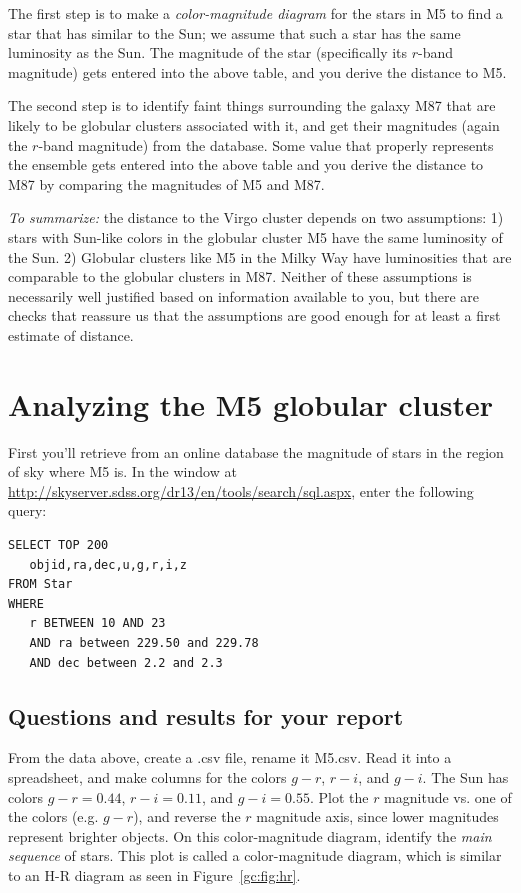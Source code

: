 The first step is to make a \textit{color-magnitude diagram} for the stars in M5 to find a star that
has similar to the Sun; we assume that such a star has the same luminosity as the Sun. The
magnitude of the star (specifically its $r$-band magnitude) gets entered into the above table,
and you derive the distance to M5.

The second step is to identify faint things surrounding the galaxy M87 that are likely to be
globular clusters associated with it, and get their magnitudes (again the $r$-band magnitude)
from the database. Some value that properly represents the ensemble gets entered into the
above table and you derive the distance to M87 by comparing the magnitudes of M5 and M87.

\textit{To summarize:} the distance to the Virgo cluster depends on two assumptions: 1) stars
with Sun-like colors in the globular cluster M5 have the same luminosity of the Sun. 2)
Globular clusters like M5 in the Milky Way have luminosities that are comparable to
the globular clusters in M87. Neither of these assumptions is necessarily well justified based on information available to you, but there are checks that reassure us that the assumptions
are good enough for at least a first estimate of distance.

\section{Analyzing the M5 globular cluster}

First you'll retrieve from an online database the magnitude of stars in the region of sky where M5 is. In the window at \url{http://skyserver.sdss.org/dr13/en/tools/search/sql.aspx}, enter the following query:

\begin{verbatim}
SELECT TOP 200
   objid,ra,dec,u,g,r,i,z
FROM Star
WHERE
   r BETWEEN 10 AND 23
   AND ra between 229.50 and 229.78
   AND dec between 2.2 and 2.3
\end{verbatim}

\subsection{Questions and results for your report}

\begin{steps}
	\item From the data above, create a .csv file, rename it M5.csv. Read it into
	a spreadsheet, and make columns for the colors $g - r$, $r - i$, and $g - i$. The Sun has
	colors $g - r = 0.44$, $r - i = 0.11$, and $g - i = 0.55$. Plot the $r$ magnitude vs. one of the colors (e.g.
	$g - r$), and reverse the $r$ magnitude axis, since lower magnitudes represent brighter objects. On this color-magnitude diagram, identify
	the \textit{main sequence} of stars. This plot is called a color-magnitude diagram, which is similar to an H-R diagram as seen in Figure~\ref{gc:fig:hr}.
\end{steps}


